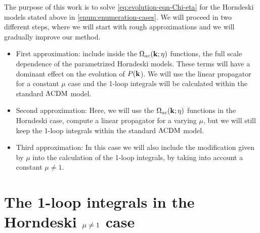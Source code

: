 The purpose of this work is to solve \cref{eq:evolution-eqn-Chi-eta}
for the Horndeski models stated above in \cref{enum:enumeration-cases}.
We will proceed in two different steps, where we will 
start with rough approximations and we will gradually improve our method.
\begin{itemize}
	\item First approximation: include inside the $\Omega_{ac}(\mathbf{k};\eta)$ functions, the
	full scale dependence of the parametrized Horndeski models.
	These terms will have a dominant effect on the evolution of $P(\mathbf{k}$).
	We will use the linear propagator for a constant $\mu$ case
	and the 1-loop integrals will be calculated within the standard $\Lambda\mathrm{CDM}$
	model.
	\item Second approximation: Here, we will use the $\Omega_{ac}(\mathbf{k};\eta)$ functions in
	the Horndeski case, compute a linear propagator for a varying $\mu$, but we will still
	keep the 1-loop integrals within the standard $\Lambda\mathrm{CDM}$
	model.
	\item Third approximation: In this case we will also include 
	the modification given by $\mu$ into the calculation of the 1-loop integrals, by taking
	into account a constant $\mu \neq 1$.
\end{itemize}
%


\section{The 1-loop integrals in the Horndeski $\mu\protect\neq1$ case}

